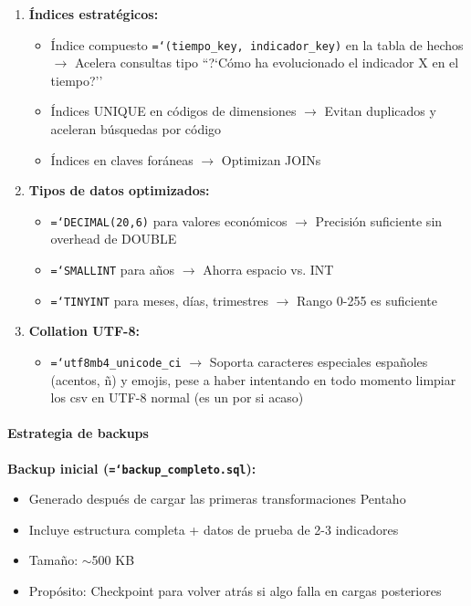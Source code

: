 \documentclass{article}
\let\oldtexttt\texttt  %
\renewcommand{\texttt}[1]{{\footnotesize\oldtexttt{\hyphenchar\font=`\-#1}}}  %
\begin{document}
\begin{enumerate}
    \item \textbf{\'Indices estrat\'egicos:}
    \begin{itemize}
        \item \'Indice compuesto \texttt{(tiempo\_key, indicador\_key)} en la tabla de hechos $\rightarrow$ Acelera consultas tipo ``?`C\'omo ha evolucionado el indicador X en el tiempo?''
        \item \'Indices UNIQUE en c\'odigos de dimensiones $\rightarrow$ Evitan duplicados y aceleran b\'usquedas por c\'odigo
        \item \'Indices en claves for\'aneas $\rightarrow$ Optimizan JOINs
    \end{itemize}
    
    \item \textbf{Tipos de datos optimizados:}
    \begin{itemize}
        \item \texttt{DECIMAL(20,6)} para valores econ\'omicos $\rightarrow$ Precisi\'on suficiente sin overhead de DOUBLE
        \item \texttt{SMALLINT} para a\~nos $\rightarrow$ Ahorra espacio vs. INT
        \item \texttt{TINYINT} para meses, d\'ias, trimestres $\rightarrow$ Rango 0-255 es suficiente
    \end{itemize}
    
    \item \textbf{Collation UTF-8:}
    \begin{itemize}
        \item \texttt{utf8mb4\_unicode\_ci} $\rightarrow$ Soporta caracteres especiales espa\~noles (acentos, \~n) y emojis, pese a haber intentando en todo momento limpiar los csv en UTF-8 normal (es un por si acaso)
    \end{itemize}
\end{enumerate}

\paragraph{Estrategia de backups}

\textbf{Backup inicial (\texttt{backup\_completo.sql}):}
\begin{itemize}
    \item Generado despu\'es de cargar las primeras transformaciones Pentaho
    \item Incluye estructura completa + datos de prueba de 2-3 indicadores
    \item Tama\~no: $\sim$500 KB
    \item Prop\'osito: Checkpoint para volver atr\'as si algo falla en cargas posteriores
\end{itemize}
\end{document}
